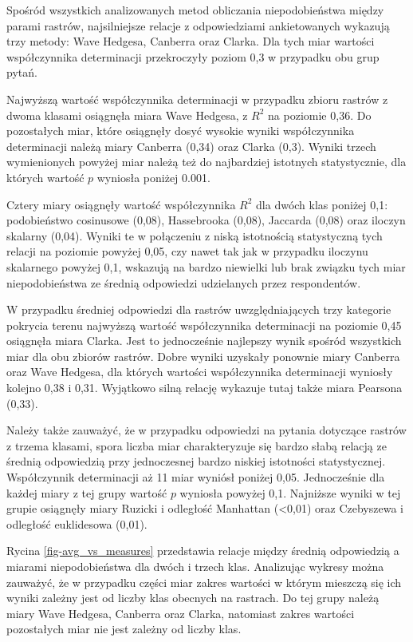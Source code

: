 \documentclass{amuthesis}
\begin{document}
Spośród wszystkich analizowanych metod obliczania niepodobieństwa między
parami rastrów, najsilniejsze relacje z odpowiedziami ankietowanych
wykazują trzy metody: Wave Hedgesa, Canberra oraz Clarka. Dla tych miar
wartości współczynnika determinacji przekroczyły poziom 0,3 w przypadku
obu grup pytań.

Najwyższą wartość współczynnika determinacji w przypadku zbioru rastrów
z dwoma klasami osiągnęła miara Wave Hedgesa, z \(R^2\) na poziomie
0,36. Do pozostałych miar, które osiągnęły dosyć wysokie wyniki
współczynnika determinacji należą miary Canberra (0,34) oraz Clarka
(0,3). Wyniki trzech wymienionych powyżej miar należą też do najbardziej
istotnych statystycznie, dla których wartość \(p\) wyniosła poniżej
0.001.

Cztery miary osiągnęły wartość współczynnika \(R^2\) dla dwóch klas
poniżej 0,1: podobieństwo cosinusowe (0,08), Hassebrooka (0,08),
Jaccarda (0,08) oraz iloczyn skalarny (0,04). Wyniki te w połączeniu z
niską istotnością statystyczną tych relacji na poziomie powyżej 0,05,
czy nawet tak jak w przypadku iloczynu skalarnego powyżej 0,1, wskazują
na bardzo niewielki lub brak związku tych miar niepodobieństwa ze
średnią odpowiedzi udzielanych przez respondentów.

W przypadku średniej odpowiedzi dla rastrów uwzględniających trzy
kategorie pokrycia terenu najwyższą wartość współczynnika determinacji
na poziomie 0,45 osiągnęła miara Clarka. Jest to jednocześnie najlepszy
wynik spośród wszystkich miar dla obu zbiorów rastrów. Dobre wyniki
uzyskały ponownie miary Canberra oraz Wave Hedgesa, dla których wartości
współczynnika determinacji wyniosły kolejno 0,38 i 0,31. Wyjątkowo silną
relację wykazuje tutaj także miara Pearsona (0,33).

Należy także zauważyć, że w przypadku odpowiedzi na pytania dotyczące
rastrów z trzema klasami, spora liczba miar charakteryzuje się bardzo
słabą relacją ze średnią odpowiedzią przy jednoczesnej bardzo niskiej
istotności statystycznej. Współczynnik determinacji aż 11 miar wyniósł
poniżej 0,05. Jednocześnie dla każdej miary z tej grupy wartość \(p\)
wyniosła powyżej 0,1. Najniższe wyniki w tej grupie osiągnęły miary
Ruzicki i odległość Manhattan (\textless0,01) oraz Czebyszewa i
odległość euklidesowa (0,01).

Rycina \ref{fig-avg_vs_measures} przedstawia relacje między średnią
odpowiedzią a miarami niepodobieństwa dla dwóch i trzech klas.
Analizując wykresy można zauważyć, że w przypadku części miar zakres
wartości w którym mieszczą się ich wyniki zależny jest od liczby klas
obecnych na rastrach. Do tej grupy należą miary Wave Hedgesa, Canberra
oraz Clarka, natomiast zakres wartości pozostałych miar nie jest zależny
od liczby klas.
\end{document}

